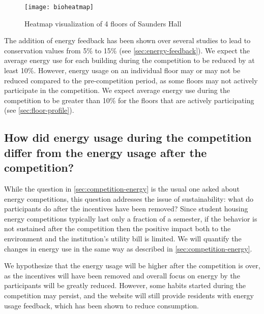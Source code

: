 \begin{figure}[htbp]
	\centering
		\texttt{[image: bioheatmap]}
		\caption{Heatmap visualization of 4 floors of Saunders Hall}
		\label{fig:bioheatmap}
\end{figure}

The addition of energy feedback has been shown over several studies to lead to conservation values from 5\% to 15\% (see \autoref{sec:energy-feedback}). We expect the average energy use for each building during the competition to be reduced by at least 10\%. However, energy usage on an individual floor may or may not be reduced compared to the pre-competition period, as some floors may not actively participate in the competition. We expect average energy use during the competition to be greater than 10\% for the floors that are actively participating (see \autoref{sec:floor-profile}).

\subsection[How did energy use change after the competition?]{How did energy usage during the competition differ from the energy usage after the competition?}
\label{sec:post-competition-energy}

While the question in \autoref{sec:competition-energy} is the usual one asked about energy competitions, this question addresses the issue of sustainability: what do participants do after the incentives have been removed? Since student housing energy competitions typically last only a fraction of a semester, if the behavior is not sustained after the competition then the positive impact both to the environment and the institution's utility bill is limited. We will quantify the changes in energy use in the same way as described in \autoref{sec:competition-energy}.

We hypothesize that the energy usage will be higher after the competition is over, as the incentives will have been removed and overall focus on energy by the participants will be greatly reduced. However, some habits started during the competition may persist, and the website will still provide residents with energy usage feedback, which has been shown to reduce consumption.

